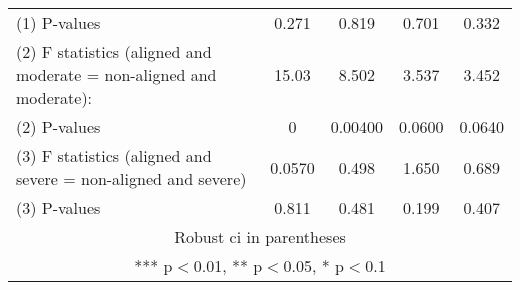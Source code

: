 \begin{tabular}{lcccc}
(1) \hspace{1mm} P-values & 0.271 & 0.819 & 0.701 & 0.332 \\
(2) F statistics (aligned and moderate = non-aligned and moderate): & 15.03 & 8.502 & 3.537 & 3.452 \\
(2) \hspace{1mm} P-values & 0 & 0.00400 & 0.0600 & 0.0640 \\
(3) F statistics (aligned and severe = non-aligned and severe) & 0.0570 & 0.498 & 1.650 & 0.689 \\
 (3) \hspace{1mm} P-values & 0.811 & 0.481 & 0.199 & 0.407 \\ \hline
\multicolumn{5}{c}{ Robust ci in parentheses} \\
\multicolumn{5}{c}{ *** p$<$0.01, ** p$<$0.05, * p$<$0.1} \\
\end{tabular}
